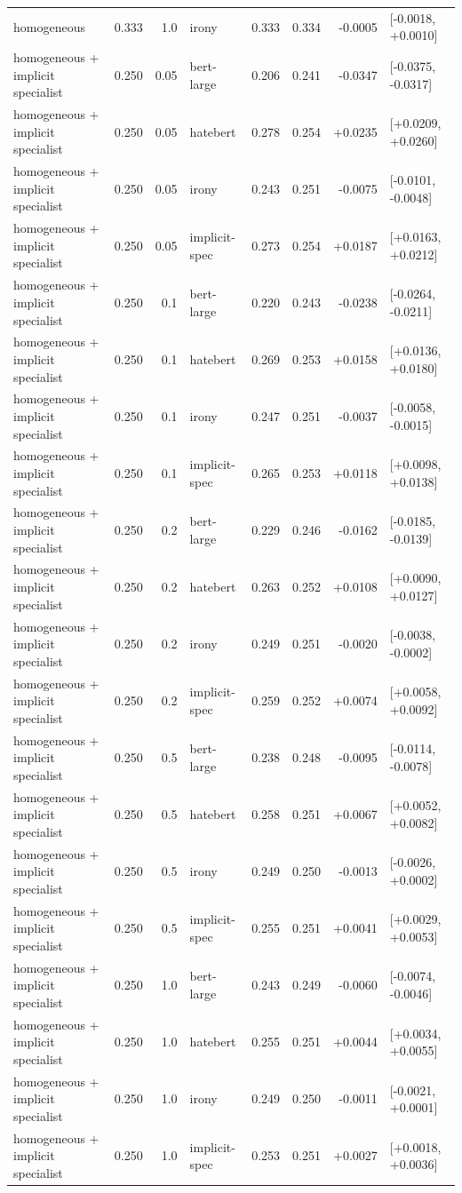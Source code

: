 \begin{table}[t]
\begin{tabular}{lrrlrrrl}
homogeneous & 0.333 & 1.0 & irony & 0.333 & 0.334 & -0.0005 & [-0.0018, +0.0010] \\
homogeneous + implicit specialist & 0.250 & 0.05 & bert-large & 0.206 & 0.241 & -0.0347 & [-0.0375, -0.0317] \\
homogeneous + implicit specialist & 0.250 & 0.05 & hatebert & 0.278 & 0.254 & +0.0235 & [+0.0209, +0.0260] \\
homogeneous + implicit specialist & 0.250 & 0.05 & irony & 0.243 & 0.251 & -0.0075 & [-0.0101, -0.0048] \\
homogeneous + implicit specialist & 0.250 & 0.05 & implicit-spec & 0.273 & 0.254 & +0.0187 & [+0.0163, +0.0212] \\
homogeneous + implicit specialist & 0.250 & 0.1 & bert-large & 0.220 & 0.243 & -0.0238 & [-0.0264, -0.0211] \\
homogeneous + implicit specialist & 0.250 & 0.1 & hatebert & 0.269 & 0.253 & +0.0158 & [+0.0136, +0.0180] \\
homogeneous + implicit specialist & 0.250 & 0.1 & irony & 0.247 & 0.251 & -0.0037 & [-0.0058, -0.0015] \\
homogeneous + implicit specialist & 0.250 & 0.1 & implicit-spec & 0.265 & 0.253 & +0.0118 & [+0.0098, +0.0138] \\
homogeneous + implicit specialist & 0.250 & 0.2 & bert-large & 0.229 & 0.246 & -0.0162 & [-0.0185, -0.0139] \\
homogeneous + implicit specialist & 0.250 & 0.2 & hatebert & 0.263 & 0.252 & +0.0108 & [+0.0090, +0.0127] \\
homogeneous + implicit specialist & 0.250 & 0.2 & irony & 0.249 & 0.251 & -0.0020 & [-0.0038, -0.0002] \\
homogeneous + implicit specialist & 0.250 & 0.2 & implicit-spec & 0.259 & 0.252 & +0.0074 & [+0.0058, +0.0092] \\
homogeneous + implicit specialist & 0.250 & 0.5 & bert-large & 0.238 & 0.248 & -0.0095 & [-0.0114, -0.0078] \\
homogeneous + implicit specialist & 0.250 & 0.5 & hatebert & 0.258 & 0.251 & +0.0067 & [+0.0052, +0.0082] \\
homogeneous + implicit specialist & 0.250 & 0.5 & irony & 0.249 & 0.250 & -0.0013 & [-0.0026, +0.0002] \\
homogeneous + implicit specialist & 0.250 & 0.5 & implicit-spec & 0.255 & 0.251 & +0.0041 & [+0.0029, +0.0053] \\
homogeneous + implicit specialist & 0.250 & 1.0 & bert-large & 0.243 & 0.249 & -0.0060 & [-0.0074, -0.0046] \\
homogeneous + implicit specialist & 0.250 & 1.0 & hatebert & 0.255 & 0.251 & +0.0044 & [+0.0034, +0.0055] \\
homogeneous + implicit specialist & 0.250 & 1.0 & irony & 0.249 & 0.250 & -0.0011 & [-0.0021, +0.0001] \\
homogeneous + implicit specialist & 0.250 & 1.0 & implicit-spec & 0.253 & 0.251 & +0.0027 & [+0.0018, +0.0036] \\
\bottomrule
\end{tabular}
\end{table}